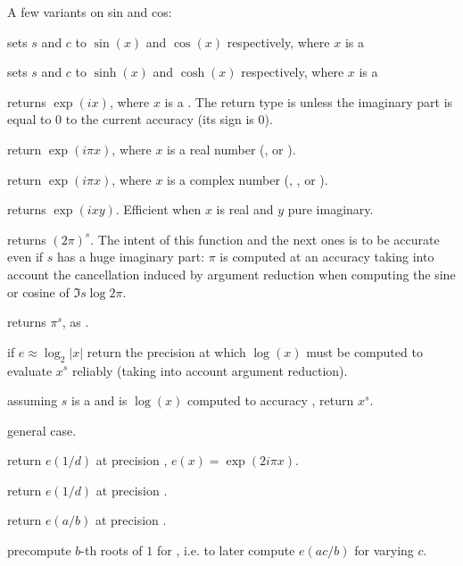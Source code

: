 \noindent A few variants on sin and cos:

 sets $s$ and $c$ to
$\sin(x)$ and $\cos(x)$ respectively, where $x$ is a 

 sets $s$ and $c$ to
$\sinh(x)$ and $\cosh(x)$ respectively, where $x$ is a 

 returns $\exp(ix)$, where $x$ is a .
The return type is  unless the imaginary part is equal to $0$
to the current accuracy (its sign is $0$).

 return $\exp(i \pi x)$, where $x$ is a
real number (,  or ).

 return $\exp(i \pi x)$, where $x$ is a
complex number (, ,  or ).

 returns $\exp(ixy)$. Efficient
when $x$ is real and $y$ pure imaginary.

 returns $(2\pi)^s$. The intent of this
function and the next ones is to be accurate even if $s$ has a huge imaginary
part: $\pi$ is computed at an accuracy taking into account the cancellation
induced by argument reduction when computing the sine or cosine of
$\Im s \log 2\pi$.

 returns $\pi^s$, as .

 if $e \approx \log_2 |x|$
return the precision at which $\log(x)$ must be computed to evaluate $x^s$
reliably (taking into account argument reduction).

 assuming $s$ is a
 and  is $\log(x)$ computed to accuracy
, return $x^s$.

 general case.

 return $e(1/d)$ at precision
, $e(x) = \exp(2i\pi x)$.

 return $e(1/d)$ at
precision .

 return $e(a/b)$ at
precision .

 precompute $b$-th
roots of $1$ for , i.e. to later compute $e(ac/b)$ for
varying $c$.

